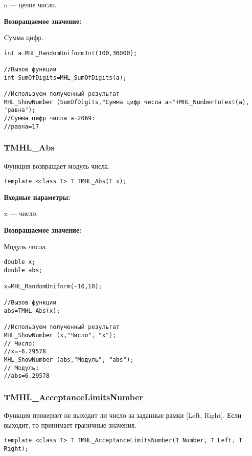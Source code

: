 \documentclass[a4paper,12pt]{article}
\begin{document}
a --- целое число.

\textbf{Возвращаемое значение:}

Cумма цифр.


\begin{lstlisting}[label=code_use_MHL_SumOfDigits,caption=Пример использования]
int a=MHL_RandomUniformInt(100,30000);

//Вызов функции
int SumOfDigits=MHL_SumOfDigits(a);

//Используем полученный результат
MHL_ShowNumber (SumOfDigits,"Сумма цифр числа a="+MHL_NumberToText(a), "равна");
//Сумма цифр числа a=2069:
//равна=17
\end{lstlisting}

\subsubsection{TMHL\_Abs}\label{TMHL_Abs}

Функция возвращает модуль числа.


\begin{lstlisting}[label=code_syntax_TMHL_Abs,caption=Синтаксис]
template <class T> T TMHL_Abs(T x);
\end{lstlisting}

\textbf{Входные параметры:}

 x --- число.
 
\textbf{Возвращаемое значение:}

 Модуль числа.


\begin{lstlisting}[label=code_use_TMHL_Abs,caption=Пример использования]
double x;
double abs;

x=MHL_RandomUniform(-10,10);

//Вызов функции
abs=TMHL_Abs(x);

//Используем полученный результат
MHL_ShowNumber (x,"Число", "x");
// Число:
//x=-6.29578
MHL_ShowNumber (abs,"Модуль", "abs");
// Модуль:
//abs=6.29578
\end{lstlisting}

\subsubsection{TMHL\_AcceptanceLimitsNumber}\label{TMHL_AcceptanceLimitsNumber}

Функция проверяет не выходит ли число за заданные рамки [Left, Right]. Если выходит, то принимает граничные значения.


\begin{lstlisting}[label=code_syntax_TMHL_AcceptanceLimitsNumber,caption=Синтаксис]
template <class T> T TMHL_AcceptanceLimitsNumber(T Number, T Left, T Right);
\end{lstlisting}
\end{document}
